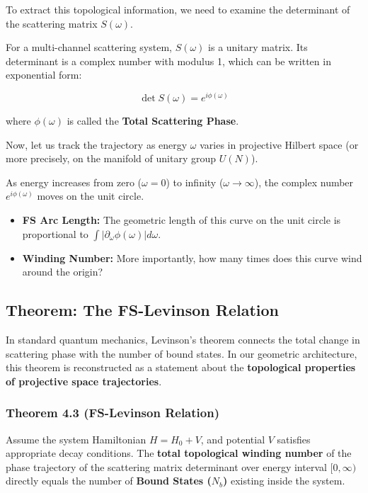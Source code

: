 To extract this topological information, we need to examine the determinant of the scattering matrix $S(\omega)$.

For a multi-channel scattering system, $S(\omega)$ is a unitary matrix. Its determinant is a complex number with modulus 1, which can be written in exponential form:

$$\det S(\omega) = e^{i\phi(\omega)}$$

where $\phi(\omega)$ is called the \textbf{Total Scattering Phase}.

Now, let us track the trajectory as energy $\omega$ varies in projective Hilbert space (or more precisely, on the manifold of unitary group $U(N)$).

As energy increases from zero ($\omega=0$) to infinity ($\omega \to \infty$), the complex number $e^{i\phi(\omega)}$ moves on the unit circle.

\begin{itemize}
\item \textbf{FS Arc Length:} The geometric length of this curve on the unit circle is proportional to $\int |\partial_\omega \phi(\omega)| d\omega$.

\item \textbf{Winding Number:} More importantly, how many times does this curve wind around the origin?
\end{itemize}

\subsection{Theorem: The FS-Levinson Relation}

In standard quantum mechanics, Levinson's theorem connects the total change in scattering phase with the number of bound states. In our geometric architecture, this theorem is reconstructed as a statement about the \textbf{topological properties of projective space trajectories}.

\subsubsection{Theorem 4.3 (FS-Levinson Relation)}

Assume the system Hamiltonian $H = H_0 + V$, and potential $V$ satisfies appropriate decay conditions. The \textbf{total topological winding number} of the phase trajectory of the scattering matrix determinant over energy interval $[0, \infty)$ directly equals the number of \textbf{Bound States ($N_b$)} existing inside the system.


